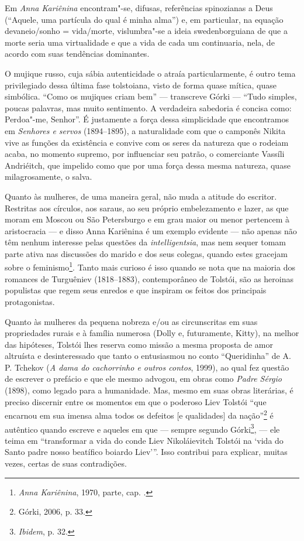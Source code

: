 Em \emph{Anna Kariênina} encontram"-se, difusas, referências
spinozianas a Deus (``Aquele, uma partícula do qual é minha
alma'') e, em particular, na equação
devaneio/sonho = vida/morte, vislumbra"-se a ideia swedenborguiana de que
a morte seria uma virtualidade e que a vida de cada um continuaria,
nela, de acordo com suas tendências dominantes.

O mujique russo, cuja sábia autenticidade o atraía particularmente,
é outro tema privilegiado dessa última fase tolstoiana, visto de
forma quase mítica, quase simbólica. ``Como os mujiques criam bem''
--- transcreve Górki --- ``Tudo simples, poucas palavras, mas muito
sentimento. A verdadeira sabedoria é concisa como: Perdoa"-me, Senhor''.
É justamente a força dessa simplicidade que encontramos
em \emph{Senhores e servos} (1894--1895), a naturalidade com que o
camponês Nikita vive as funções da existência e convive com os seres da
natureza que o rodeiam acaba, no momento supremo, por influenciar seu
patrão, o comerciante Vassíli Andriéitch, que impelido como que por uma
força dessa mesma natureza, quase milagrosamente, o salva.

Quanto às mulheres, de uma maneira geral, não muda a atitude do
escritor. Restritas aos círculos, aos saraus, ao seu próprio
embelezamento e lazer, as que moram em Moscou ou São Petersburgo e em
grau maior ou menor pertencem à aristocracia --- e disso Anna Kariênina é
um exemplo evidente --- não apenas não têm nenhum interesse pelas
questões da \emph{intelligentsia}, mas nem sequer tomam parte ativa nas
discussões do marido e dos seus colegas, quando estes gracejam sobre o
feminismo\footnote{\emph{Anna Kariênina}, 1970,  parte, cap. .}. Tanto mais
curioso é isso quando se nota que na maioria dos romances de Turguêniev
(1818--1883), contemporâneo de Tolstói, são as heroinas populistas
que regem seus enredos e que inspiram os feitos dos principais
protagonistas.

Quanto às mulheres da pequena nobreza e/ou as circunscritas em
suas propriedades rurais e à família numerosa (Dolly e, futuramente,
Kitty), na melhor das hipóteses, Tolstói lhes reserva como missão a
mesma proposta de amor altruísta e desinteressado que tanto o
entusiasmou no conto ``Queridinha'' de A. P. Tchekov (\emph{A dama do
cachorrinho e outros contos}, 1999), ao qual fez questão de escrever o
prefácio e que ele mesmo advogou, em obras como \emph{Padre Sérgio} (1898), como legado para a humanidade. Mas, mesmo em suas obras
literárias, é preciso discernir entre os momentos em que o
poderoso Liev Tolstói ``que encarnou em sua imensa alma todos os
defeitos [e qualidades] da nação''\footnote{Górki, 2006, p. 33.} é autêntico
quando escreve e aqueles em que --- sempre segundo Górki\footnote{\emph{Ibidem}, p. 32.},
--- ele teima em ``transformar a vida do conde Liev Nikoláievitch
Tolstói na ‘vida do Santo padre nosso beatífico boiardo Liev’''. Isso
contribui para explicar, muitas vezes, certas de suas contradições.

